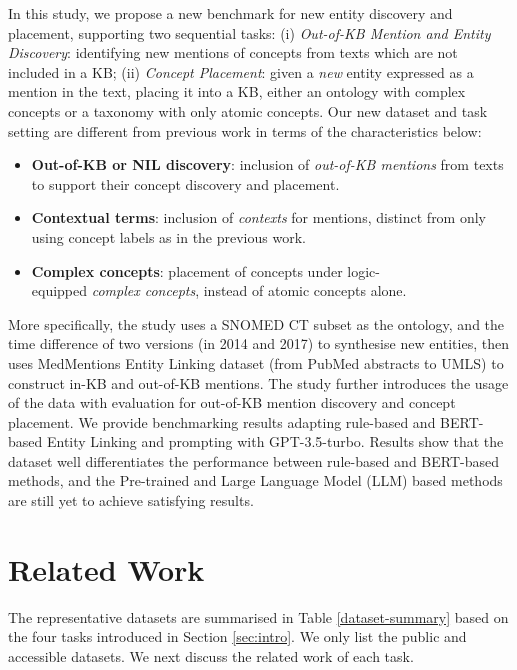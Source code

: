 \documentclass[sigconf]{acmart}
\begin{document}
In this study, we propose a new benchmark for new entity discovery and placement, supporting two sequential tasks: (i) \textit{Out-of-KB Mention and Entity Discovery}: identifying new mentions of concepts from texts which are not included in a KB; (ii) \textit{Concept Placement}: given a \textit{new} entity expressed as a mention in the text, placing it into a KB, either an ontology with complex concepts or a taxonomy with only atomic concepts. Our new dataset and task setting are different from previous work in terms of the characteristics below:

\begin{itemize}
\item \textbf{Out-of-KB or NIL discovery}: inclusion of \textit{out-of-KB mentions} from texts to support their concept discovery and placement.
\item \textbf{Contextual terms}: inclusion of \textit{contexts} for mentions, distinct from only using concept labels as in the previous work.
\item \textbf{Complex concepts}: placement of concepts under logic-\\equipped \textit{complex concepts}, instead of atomic concepts alone.
\end{itemize}

More specifically, the study uses a SNOMED CT subset as the ontology, and the time difference of two versions (in 2014 and 2017) to synthesise new entities, then uses MedMentions Entity Linking dataset \cite{Mohan2019medmentions} (from PubMed abstracts to UMLS) to construct in-KB and out-of-KB mentions. The study further introduces the usage of the data with evaluation for out-of-KB mention discovery and concept placement. We provide benchmarking results adapting rule-based and BERT-based Entity Linking \cite{dong2023NIL,wu2020blink} and prompting with GPT-3.5-turbo. Results show that the dataset well differentiates the performance between rule-based and BERT-based methods, and the
Pre-trained and Large Language Model (LLM) based methods are still yet to achieve satisfying results.

\section{Related Work}
The representative datasets are summarised in Table \ref{dataset-summary} based on the four tasks introduced in Section \ref{sec:intro}. We only list the public and accessible datasets. We next discuss the related work of each task.
\end{document}
